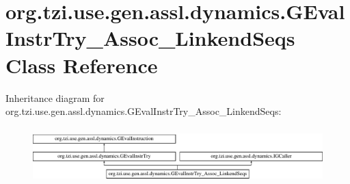 \hypertarget{classorg_1_1tzi_1_1use_1_1gen_1_1assl_1_1dynamics_1_1_g_eval_instr_try___assoc___linkend_seqs}{\section{org.\-tzi.\-use.\-gen.\-assl.\-dynamics.\-G\-Eval\-Instr\-Try\-\_\-\-Assoc\-\_\-\-Linkend\-Seqs Class Reference}
\label{classorg_1_1tzi_1_1use_1_1gen_1_1assl_1_1dynamics_1_1_g_eval_instr_try___assoc___linkend_seqs}
}
Inheritance diagram for org.\-tzi.\-use.\-gen.\-assl.\-dynamics.\-G\-Eval\-Instr\-Try\-\_\-\-Assoc\-\_\-\-Linkend\-Seqs\-:\begin{figure}[H]
\begin{center}
\leavevmode
\includegraphics[height=2.164948cm]{classorg_1_1tzi_1_1use_1_1gen_1_1assl_1_1dynamics_1_1_g_eval_instr_try___assoc___linkend_seqs}
\end{center}
\end{figure}
